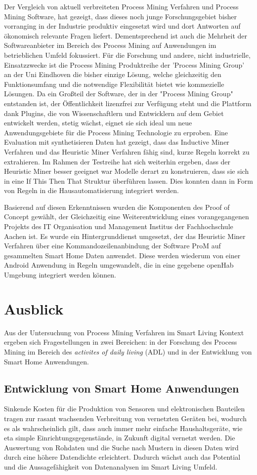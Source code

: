 Der Vergleich von aktuell verbreiteten Process Mining Verfahren und Process Mining Software, hat gezeigt, dass dieses noch junge Forschungsgebiet bisher vorranging in der Industrie produktiv eingesetzt wird und dort Antworten auf ökonomisch relevante Fragen liefert. Dementsprechend ist auch die Mehrheit der Softwareanbieter im Bereich des Process Mining auf Anwendungen im betrieblichen Umfeld fokussiert. 
Für die Forschung und andere, nicht industrielle, Einsatzzwecke ist die Process Mining Produktreihe der 'Process Mining Group' an der Uni Eindhoven die bisher einzige Lösung, welche gleichzeitig den Funktionsumfang und die notwendige Flexibilität bietet wie kommezielle Lösungen. Da ein Großteil der Software, der in der "Process Mining Group" entstanden ist, der Öffentlichkeit lizenzfrei zur Verfügung steht und die Plattform dank Plugins, die von Wissenschaftlern und Entwicklern auf dem Gebiet entwickelt werden, stetig wächst, eignet sie sich ideal um neue Anwendungsgebiete für die Process Mining Technologie zu erproben.
Eine Evaluation mit synthetisieren Daten hat gezeigt, dass das Inductive Miner Verfahren und das Heuristic Miner Verfahren fähig sind, kurze Regeln korrekt zu extrahieren. Im Rahmen der Testreihe hat sich weiterhin ergeben, dass der Heuristic Miner besser geeignet war Modelle derart zu konstruieren, dass sie sich in eine If This Then That Struktur überführen lassen. Dies konnten dann in Form von Regeln in die  Hausautomatisierung integriert werden.

Basierend auf diesen Erkenntnissen wurden die Komponenten des Proof of Concept gewählt, der Gleichzeitig eine Weiterentwicklung eines vorangegangenen Projekts des IT Organisation und Management Institus der Fachhochschule Aachen ist. Es wurde ein Hintergrunddienst umgesetzt, der das Heuristic Miner Verfahren über eine Kommandozeilenanbindung der Software ProM auf gesammelten Smart Home Daten anwendet. Diese werden wiederum von einer Android Anwendung in Regeln umgewandelt, die in eine gegebene openHab Umgebung integriert werden können.
\newpage
\section{Ausblick}
Aus der Untersuchung von Process Mining Verfahren im Smart Living Kontext ergeben sich Fragestellungen in zwei Bereichen: in der Forschung des Process Mining im Bereich des \textit{activites of daily living} (ADL) und in der Entwicklung von Smart Home Anwendungen.

\subsection{Entwicklung von Smart Home Anwendungen}
Sinkende Kosten für die Produktion von Sensoren und elektronischen Bauteilen tragen zur rasant wachsenden Verbreitung von vernetzten Geräten bei, wodurch es als wahrscheinlich gilt, dass auch immer mehr einfache Haushaltsgeräte, wie eta simple Einrichtungsgegenstände, in Zukunft digital vernetzt werden. Die Auswertung von Rohdaten und die Suche nach Mustern in diesen Daten wird durch eine höhere Datendichte erleichtert. Dadurch wächst auch das Potential und die Aussagefähigkeit von Datenanalysen im Smart Living Umfeld.

